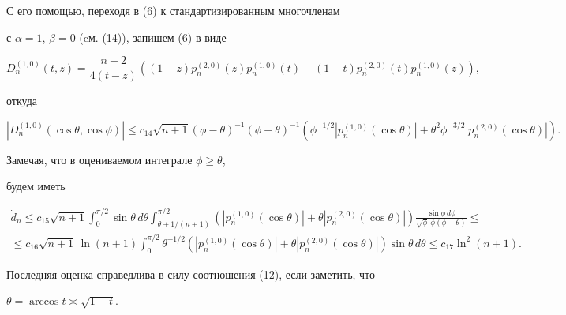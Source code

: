 С его помощью, переходя в (6) к стандартизированным многочленам


с $\alpha =1$, $\beta =0$ (cм. (14)), запишем (6) в виде


\begin{equation}


D_n^{(1,0)}(t,z)=\frac{n+2}{4(t-z)}


((1-z) p_{n}^{(2,0)}(z) p_n^{(1,0)}(t) -(1-t)


p_{n}^{(2,0)}(t)


p_n^{(1,0)}(z)),


\end{equation}


откуда


$$


|D_n^{(1,0)}(\cos \theta,\cos \phi)|\le


c_{14} \sqrt{n+1}


(\phi -\theta)^{-1} (\phi +\theta)^{-1}


(\phi^{-1/2} | p_n^{(1,0)}(\cos \theta)|+


\theta^2 \phi^{-3/2}| p_n^{(2,0)}(\cos \theta)|).


$$


Замечая, что в оцениваемом интеграле $\phi \ge \theta$,


будем иметь


\begin{multline*}


\Dot d_n \le c_{15} \sqrt{n+1}


\int_0^{{\pi}/2}\sin\theta\, d\theta


\int_{\theta + {1}/(n+1)}^{\pi/2}


(|p_n^{(1,0)}(\cos \theta)|+\theta |p_n^{(2,0)}(\cos \theta)|)


\frac{\sin \phi\, d\phi}{\sqrt{\phi}\,\phi (\phi - \theta)} \le \\


%


\le c_{16} \sqrt{n+1}\,\ln(n+1)


\int_0^{{\pi}/{2}}\theta^{-{1}/{2}}


(|p_n^{(1,0)}(\cos \theta)|+\theta |p_n^{(2,0)}(\cos \theta)|)


\sin \theta\, d\theta \le c_{17}\ln^2 (n+1).


\end{multline*}


Последняя оценка справедлива в силу соотношения (12), если заметить, что


$\theta=\arccos t \asymp \sqrt{1-t}$.


